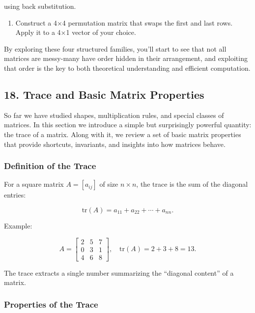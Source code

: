 \documentclass[
  letterpaper,
  DIV=11,
  numbers=noendperiod]{scrreprt}
\providecommand{\tightlist}{%
  \setlength{\itemsep}{0pt}\setlength{\parskip}{0pt}}
\begin{document}
using back substitution.

\begin{enumerate}
\def\labelenumi{\arabic{enumi}.}
\setcounter{enumi}{3}
\tightlist
\item
  Construct a 4×4 permutation matrix that swaps the first and last rows.
  Apply it to a 4×1 vector of your choice.
\end{enumerate}

By exploring these four structured families, you'll start to see that
not all matrices are messy-many have order hidden in their arrangement,
and exploiting that order is the key to both theoretical understanding
and efficient computation.

\subsection{18. Trace and Basic Matrix
Properties}\label{trace-and-basic-matrix-properties}

So far we have studied shapes, multiplication rules, and special classes
of matrices. In this section we introduce a simple but surprisingly
powerful quantity: the trace of a matrix. Along with it, we review a set
of basic matrix properties that provide shortcuts, invariants, and
insights into how matrices behave.

\subsubsection{Definition of the Trace}\label{definition-of-the-trace}

For a square matrix \(A = [a_{ij}]\) of size \(n \times n\), the trace
is the sum of the diagonal entries:

\[
\text{tr}(A) = a_{11} + a_{22} + \cdots + a_{nn}.
\]

Example:

\[
A = \begin{bmatrix} 
2 & 5 & 7 \\ 
0 & 3 & 1 \\ 
4 & 6 & 8 
\end{bmatrix}, 
\quad 
\text{tr}(A) = 2 + 3 + 8 = 13.
\]

The trace extracts a single number summarizing the ``diagonal content''
of a matrix.

\subsubsection{Properties of the Trace}\label{properties-of-the-trace}
\end{document}

